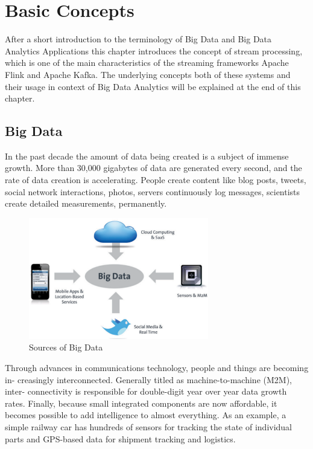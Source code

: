 \chapter{Basic Concepts}
After a short introduction to the terminology of Big Data and Big Data Analytics Applications
this chapter introduces the concept of stream processing, which is one of the main characteristics
of the streaming frameworks Apache Flink and Apache Kafka. The underlying concepts both of these systems
and their usage in context of Big Data Analytics will be explained at the end of this chapter.

\section{Big Data}
In the past decade the amount of data being created is a subject of immense growth.
More than 30,000 gigabytes of data are generated every second, and the rate of data
creation is accelerating\cite{Marz15}. People create content like blog posts, tweets, social
network interactions, photos, servers continuously log messages, scientists create detailed
measurements, permanently.

\begin{figure}[H]
	\centering
	\includegraphics[width=0.7\textwidth]{../images/04-sources-of-bigdata.png}
	\caption{Sources of Big Data{\cite{Bitk12}}}
	\label{sources-of-bigdata}
\end{figure}

Through advances in communications technology, people and things are becoming in-
creasingly interconnected. Generally titled as machine-to-machine (M2M), inter-
connectivity is responsible for double-digit year over year data growth rates. Finally,
because small integrated components are now affordable, it becomes possible to add
intelligence to almost everything. As an example, a simple railway car has hundreds
of sensors for tracking the state of individual parts and GPS-based data for shipment
tracking and logistics\cite{Ziko12}.


